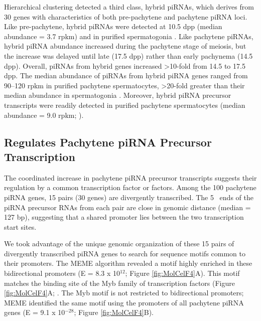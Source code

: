     Hierarchical clustering detected a third class, hybrid piRNAs, which derives from 30 genes with characteristics of both pre-pachytene and pachytene piRNA loci. Like pre-pachytene, hybrid piRNAs were detected at 10.5 dpp (median abundance = 3.7 rpkm) and in purified spermatogonia \citep{Gan2011}. Like pachytene piRNAs, hybrid piRNA abundance increased during the pachytene stage of meiosis, but the increase was delayed until late (17.5 dpp) rather than early pachynema (14.5 dpp). Overall, piRNAs from hybrid genes increased >10-fold from 14.5 to 17.5 dpp. The median abundance of piRNAs from hybrid piRNA genes ranged from 90–120 rpkm in purified pachytene spermatocytes, >20-fold greater than their median abundance in spermatogonia \citep{Gan2011,Modzelewski2012}. Moreover, hybrid piRNA precursor transcripts were readily detected in purified pachytene spermatocytes (median abundance = 9.0 rpkm; \citep{Modzelewski2012}).

  \subsection{\amyb{} Regulates Pachytene piRNA Precursor Transcription}

    The coordinated increase in pachytene piRNA precursor transcripts suggests their regulation by a common transcription factor or factors. Among the 100 pachytene piRNA genes, 15 pairs (30 genes) are divergently transcribed. The 5\textprime~ ends of the piRNA precursor RNAs from each pair are close in genomic distance (median = 127 bp), suggesting that a shared promoter lies between the two transcription start sites.
     
    We took advantage of the unique genomic organization of these 15 pairs of divergently transcribed piRNA genes to search for sequence motifs common to their promoters. The MEME algorithm \citep{Bailey1994} revealed a motif highly enriched in these bidirectional promoters (E = 8.3 x 10$^{12}$; Figure \ref{fig:MolCelF4}A). This motif matches the binding site of the Myb family of transcription factors (Figure \ref{fig:MolCelF4}A; \citep{Gupta2007, Newburger2009}. The Myb motif is not restricted to bidirectional promoters; MEME identified the same motif using the promoters of all pachytene piRNA genes (E = 9.1 x 10$^{-28}$; Figure \ref{fig:MolCelF4}B).

